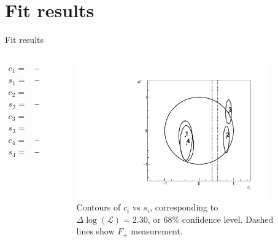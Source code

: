 \documentclass{beamer}
\begin{document}
\section{Fit results}
\begin{frame}{Fit results}
  \vspace{-0.5cm}
  \begin{columns}
    \begin{column}{0.4\textwidth}
      \begin{align*}
        c_1 =& \SI{-0.40(13)}{} \\
        s_1 =& \SI{-0.18(32)}{} \\
        c_2 =& \phantom{-}\SI{0.79(6)}{} \\
        s_2 =& \SI{-0.21(24)}{} \\
        c_3 =& \phantom{-}\SI{0.85(6)}{} \\
        s_3 =& \phantom{-}\SI{0.53(24)}{} \\
        c_4 =& \SI{-0.36(13)}{} \\
        s_4 =& \SI{-0.38(31)}{}
      \end{align*}
    \end{column}
    \begin{column}{0.6\textwidth}
      \begin{figure}
        \includegraphics[width=0.9\textwidth]{Plots/Contours_cisi.pdf}
        \caption{Contours of $c_i$ vs $s_i$, corresponding to $\Delta\log(\mathcal{L}) = 2.30$, or $68\%$ confidence level. Dashed lines show $F_+$ measurement.}
      \end{figure}
    \end{column}
  \end{columns}
\end{frame}
\end{document}
